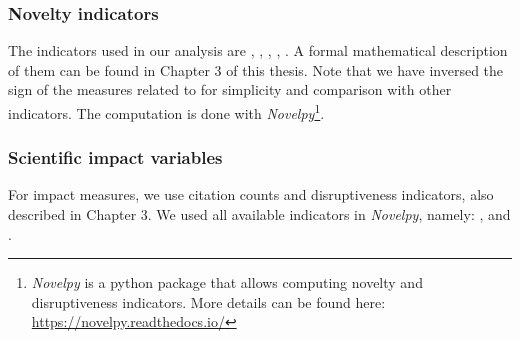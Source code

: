 \subsubsection*{Novelty indicators}
The indicators used in our analysis are \cite{uzzi2013atypical}, \cite{lee2015creativity}, \cite{foster2015tradition}, \cite{wang2017bias}, \cite{shibayama2021measuring}. A formal mathematical description of them can be found in Chapter 3 of this thesis. Note that we have inversed the sign of the measures related to \cite{uzzi2013atypical} for simplicity and comparison with other indicators. The computation is done with \textit{Novelpy}\footnote{\justifying \textit{Novelpy} is a python package that allows computing novelty and disruptiveness indicators. More details can be found here: \href{https://novelpy.readthedocs.io/}{https://novelpy.readthedocs.io/}}.%


\subsubsection*{Scientific impact variables}
For impact measures, we use citation counts and disruptiveness indicators, also described in Chapter 3. We used all available indicators in \textit{Novelpy}, namely: \cite{wu2019large}, \cite{bu2019multi} and \cite{bornmann1911disruption}.%





